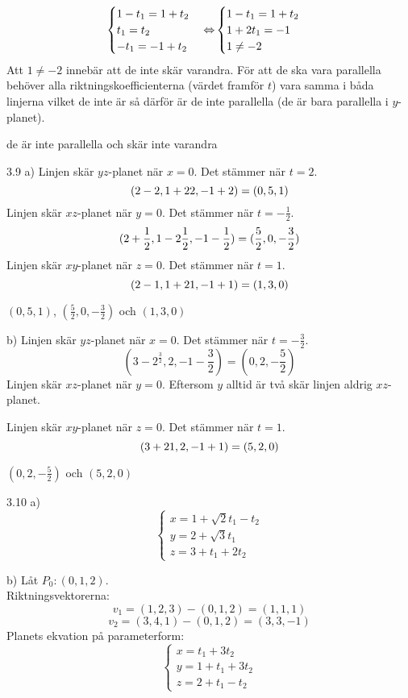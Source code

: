 \begin{task}{3.8}
	\[\begin{cases}
		1-t_1=1+t_2 \\
		t_1=t_2 \\
		-t_1=-1+t_2
	\end{cases} \operatorname{\Leftrightarrow}
	\begin{cases}
		1-t_1=1+t_2 \\
		1+2t_1=-1 \\
		1\neq-2
	\end{cases}\]
	Att $1\neq-2$ innebär att de inte skär varandra. För att de ska vara parallella behöver alla riktningskoefficienterna (värdet framför $t$) vara samma i båda linjerna vilket de inte är så därför är de inte parallella (de är bara parallella i $y$-planet).

	\ans de är inte parallella och skär inte varandra
\end{task}

\begin{task}{3.9 a)}
	Linjen skär $yz$-planet när $x=0$. Det stämmer när $t=2$.
	\[(2-2,1+2\*2,-1+2)=(0,5,1)\]
	Linjen skär $xz$-planet när $y=0$. Det stämmer när $t=-\frac{1}{2}$.
	\[(2+\frac{1}{2},1-2\*\frac{1}{2},-1-\frac{1}{2})=(\frac{5}{2},0,-\frac{3}{2})\]
	Linjen skär $xy$-planet när $z=0$. Det stämmer när $t=1$.
	\[(2-1,1+2\*1,-1+1)=(1,3,0)\]

	\ans $(0,5,1)$, $(\frac{5}{2},0,-\frac{3}{2})$ och $(1,3,0)$
\end{task}

\begin{task}{b)}
	Linjen skär $yz$-planet när $x=0$. Det stämmer när $t=-\frac{3}{2}$.
	\[(3-2^\frac{3}{2},2,-1-\frac{3}{2})=(0,2,-\frac{5}{2})\]
	Linjen skär $xz$-planet när $y=0$. Eftersom $y$ alltid är två skär  linjen aldrig $xz$-planet.
	
	Linjen skär $xy$-planet när $z=0$. Det stämmer när $t=1$.
	\[(3+2\*1,2,-1+1)=(5,2,0)\]
	
	\ans $(0,2,-\frac{5}{2})$ och $(5,2,0)$
\end{task}

\begin{task}{3.10 a)}
	\[\begin{cases}
		x=1+\sqrt{2}t_1-t_2 \\
		y=2+\sqrt{3}t_1 \\
		z=3+t_1+2t_2
	\end{cases}\]
\end{task}

\begin{task}{b)}
	Låt $P_0:(0,1,2)$. \\
	Riktningsvektorerna:
	\[v_1=(1,2,3)-(0,1,2)=(1,1,1)\]
	\[v_2=(3,4,1)-(0,1,2)=(3,3,-1)\]
	Planets ekvation på parameterform:
	\[\begin{cases}
		x=t_1+3t_2 \\
		y=1+t_1+3t_2 \\
		z=2+t_1-t_2
	\end{cases}\]
\end{task}

